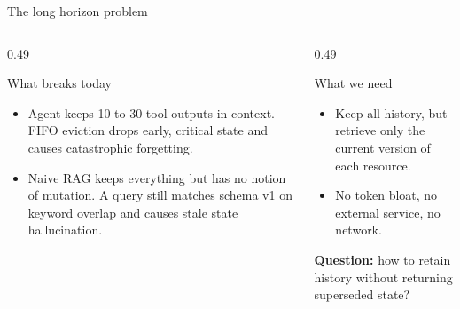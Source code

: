\documentclass[aspectratio=169,10pt]{beamer}
\begin{document}
\begin{frame}{The long horizon problem}
  \begin{columns}[T,onlytextwidth]
    \begin{column}{0.49\textwidth}
      \begin{block}{What breaks today}
        \begin{itemize}
          \item Agent keeps 10 to 30 tool outputs in context. FIFO eviction drops early, critical state and causes catastrophic forgetting.
          \item Naive RAG keeps everything but has no notion of mutation. A query still matches schema v1 on keyword overlap and causes stale state hallucination.
        \end{itemize}
      \end{block}
    \end{column}
    \begin{column}{0.49\textwidth}
      \begin{block}{What we need}
        \begin{itemize}
          \item Keep all history, but retrieve only the current version of each resource.
          \item No token bloat, no external service, no network.
        \end{itemize}
      \end{block}
      \vspace{0.6em}
      {\small \textbf{Question:} how to retain history without returning superseded state?}
    \end{column}
  \end{columns}
\end{frame}
\end{document}
